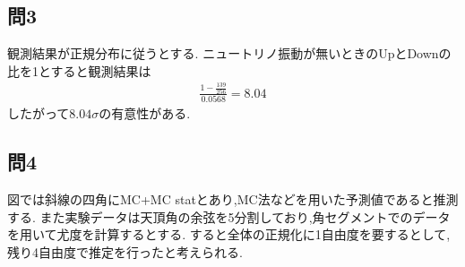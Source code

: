 \documentclass[uplatex,a4j,11pt,dvipdfmx]{jsarticle}
\begin{document}
\subsection*{問3}
観測結果が正規分布に従うとする.
ニュートリノ振動が無いときのUpとDownの比を1とすると観測結果は
\begin{align}
  \frac{1-\frac{139}{256}}{0.0568}=8.04
\end{align}
したがって$8.04\sigma$の有意性がある.
\subsection*{問4}
図では斜線の四角にMC+MC statとあり,MC法などを用いた予測値であると推測する.
また実験データは天頂角の余弦を5分割しており,角セグメントでのデータを用いて尤度を計算するとする.
すると全体の正規化に1自由度を要するとして,残り4自由度で推定を行ったと考えられる.

\end{document}
